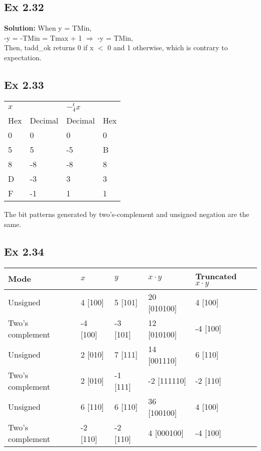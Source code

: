 \subsection{Ex 2.32}
{\color{red}\textbf{Solution: }When y = TMin,\\
    -y = -TMin = Tmax + 1 $\Rightarrow$ -y = TMin,\\
    Then, tadd\_ok returns 0 if x $<$ 0 and 1 otherwise, which is contrary to expectation.
}

\subsection{Ex 2.33}
\begin{table}[h]
    \centering
    \begin{tabular}{llll}
        \toprule
        $x$ && $-^t_4 x$ & \\
        Hex & Decimal & Decimal & Hex\\
        \midrule
        0 & 0 & 0 & 0\\
        5 & 5 & -5 & B\\
        8 & -8 & -8 & 8\\
        D & -3 & 3 & 3\\
        F & -1 & 1 & 1\\
        \bottomrule
    \end{tabular}
\end{table}
The bit patterns generated by two's-complement and unsigned negation are the same.

\subsection{Ex 2.34}
\begin{table}[h]
    \centering
    \begin{tabular}{lllll}
        \toprule
        Mode & $x$ & $y$ & $x \cdot y$ & Truncated $x \cdot y$\\
        \midrule
        Unsigned & 4 [100] & 5 [101] & 20 [010100] & 4 [100]\\
        Two's complement & -4 [100] & -3 [101] & 12 [010100] & -4 [100]\\         
        Unsigned & 2 [010] & 7 [111] & 14 [001110] & 6 [110]\\
        Two's complement & 2 [010] & -1 [111] & -2 [111110] & -2 [110]\\
        Unsigned & 6 [110] & 6 [110] & 36 [100100] & 4 [100]\\
        Two's complement & -2 [110] & -2 [110] & 4 [000100] & -4 [100]\\
        \bottomrule
    \end{tabular}
\end{table}


